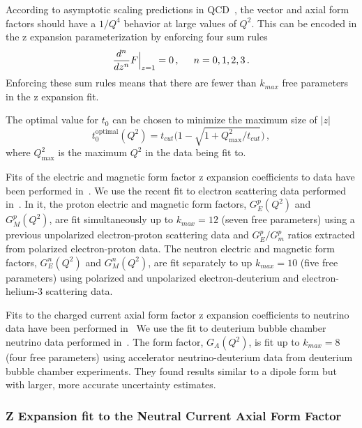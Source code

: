  According to asymptotic scaling predictions in QCD~\cite{Lepage:1980fj}, the
  vector and axial form factors should have a $1/Q^4$ behavior at large values
  of $Q^2$. This can be encoded in the z expansion parameterization by
  enforcing four sum rules~\cite{Lee:2015jqa}
  \begin{align}\label{eq:zsumrules}
    \frac{d^n}{dz^n} F\Big\rvert_{z=1} = 0\,, \hspace{5mm} n=0,1,2,3 \,.
  \end{align}
  Enforcing these sum rules means that there are fewer than $k_{max}$ free
  parameters in the z expansion fit.

  The optimal value for $t_0$ can be chosen to minimize the maximum size of
  $|z|$~\cite{Meyer:2016oeg}
  \begin{equation}\label{eq:topt}
    t_0^{\textrm{optimal}}(Q^2) = t_{cut}\Big(1 - \sqrt{1+Q^2_{\textrm{max}}/t_{cut}}\Big) \,,
  \end{equation}
  where $Q^2_{\textrm{max}}$ is the maximum $Q^2$ in the data being fit to.

  Fits of the electric and magnetic form factor z expansion coefficients to
  data have been performed
  in~\cite{Hill:2010yb,Epstein:2014zua,Lee:2015jqa,Ye:2017gyb}.  We use the
  recent fit to electron scattering data performed in~\cite{Ye:2017gyb}. In it,
  the proton electric and magnetic form factors, $G_E^p(Q^2)$ and $G_M^p(Q^2)$,
  are fit simultaneously up to $k_{max} = 12$ (seven free parameters) using a
  previous unpolarized electron-proton scattering data and $G_E^p/G_m^p$ ratios
  extracted from polarized electron-proton data. The neutron electric and
  magnetic form factors, $G_E^n(Q^2)$ and $G_M^n(Q^2)$, are fit separately to
  up $k_{max} = 10$ (five free parameters) using polarized and unpolarized
  electron-deuterium and electron-helium-3 scattering data.

  Fits to the charged current axial form factor z expansion coefficients to
  neutrino data have been performed
  in~\cite{Bhattacharya:2011ah,Bhattacharya:2015mpa,Meyer:2016oeg} We use the
  fit to deuterium bubble chamber neutrino data performed
  in~\cite{Meyer:2016oeg}. The form factor, $G_A(Q^2)$, is fit up to $k_{max} =
  8$ (four free parameters) using accelerator neutrino-deuterium data from
  deuterium bubble chamber experiments. They found results similar to a dipole
  form but with larger, more accurate uncertainty estimates.


  \subsubsection{Z Expansion fit to the Neutral Current Axial Form Factor}

